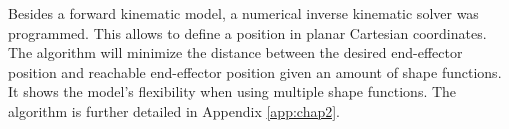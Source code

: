 Besides a forward kinematic model, a numerical inverse kinematic solver was programmed. This allows to define a position in planar Cartesian coordinates. The algorithm will minimize the distance between the desired end-effector position and reachable end-effector position given an amount of shape functions. It shows the model's flexibility when using multiple shape functions. The algorithm is further detailed in Appendix \ref{app:chap2}. 










